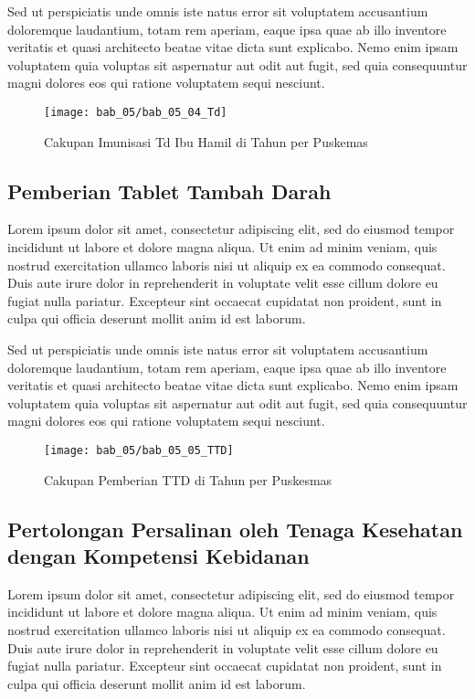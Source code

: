 Sed ut perspiciatis unde omnis iste natus error sit voluptatem accusantium doloremque laudantium, totam rem aperiam, eaque ipsa quae ab illo inventore veritatis et quasi architecto beatae vitae dicta sunt explicabo. Nemo enim ipsam voluptatem quia voluptas sit aspernatur aut odit aut fugit, sed quia consequuntur magni dolores eos qui ratione voluptatem sequi nesciunt.

\begin{figure}[H]
    \centering{}
    \texttt{[image: bab\_05/bab\_05\_04\_Td]}
    \caption{Cakupan Imunisasi Td Ibu Hamil di \namaKabupaten Tahun \tP per
Puskemas}
    \label{fig:Cakupan-Td}
\end{figure}


\subsection{Pemberian Tablet Tambah Darah}
Lorem ipsum dolor sit amet, consectetur adipiscing elit, sed do eiusmod tempor incididunt ut labore et dolore magna aliqua. Ut enim ad minim veniam, quis nostrud exercitation ullamco laboris nisi ut aliquip ex ea commodo consequat. Duis aute irure dolor in reprehenderit in voluptate velit esse cillum dolore eu fugiat nulla pariatur. Excepteur sint occaecat cupidatat non proident, sunt in culpa qui officia deserunt mollit anim id est laborum.

Sed ut perspiciatis unde omnis iste natus error sit voluptatem accusantium doloremque laudantium, totam rem aperiam, eaque ipsa quae ab illo inventore veritatis et quasi architecto beatae vitae dicta sunt explicabo. Nemo enim ipsam voluptatem quia voluptas sit aspernatur aut odit aut fugit, sed quia consequuntur magni dolores eos qui ratione voluptatem sequi nesciunt.

\begin{figure}[H]
    \centering
    \texttt{[image: bab\_05/bab\_05\_05\_TTD]}
    \caption{Cakupan Pemberian TTD di \namaKabupaten Tahun \tP per Puskesmas}
    \label{fig:Cakupan-TTD}
\end{figure}

\subsection{Pertolongan Persalinan oleh Tenaga Kesehatan dengan Kompetensi Kebidanan}
Lorem ipsum dolor sit amet, consectetur adipiscing elit, sed do eiusmod tempor incididunt ut labore et dolore magna aliqua. Ut enim ad minim veniam, quis nostrud exercitation ullamco laboris nisi ut aliquip ex ea commodo consequat. Duis aute irure dolor in reprehenderit in voluptate velit esse cillum dolore eu fugiat nulla pariatur. Excepteur sint occaecat cupidatat non proident, sunt in culpa qui officia deserunt mollit anim id est laborum.

